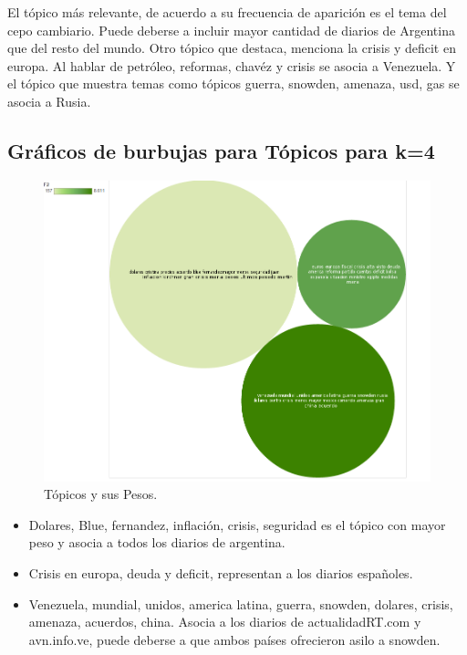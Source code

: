 \documentclass[8.5pt,twoside,twocolumn]{article}
\begin{document}
El t\'opico m\'as relevante, de acuerdo a su frecuencia de aparici\'on es el tema del cepo cambiario.  
Puede deberse a incluir mayor cantidad de diarios de Argentina que del resto del mundo.  
Otro t\'opico que destaca, menciona la crisis y deficit en europa.  
Al hablar de petr\'oleo, reformas, chav\'ez y crisis se asocia a Venezuela. 
Y el t\'opico que muestra temas como t\'opicos guerra, snowden, amenaza, usd, gas se asocia a Rusia.

\subsection{ Gr\'aficos de burbujas para T\'opicos para k=4  }
\begin{figure}[h]
  \centering
  \includegraphics[scale=0.2]{burble_k4_10_mallet_keys.png}
  \caption{T\'opicos y sus Pesos.}  
  \label{fgr:perplexity}
\end{figure}

\begin{itemize}
\item Dolares, Blue, fernandez, inflaci\'on, crisis, seguridad es el t\'opico con mayor peso y asocia a todos los diarios de argentina.
\item Crisis en europa, deuda y deficit, representan a los diarios espa\~noles. 
\item Venezuela, mundial, unidos, america latina, guerra, snowden, dolares, crisis, amenaza, acuerdos, china. Asocia a los diarios de actualidadRT.com
y avn.info.ve, puede deberse a que ambos pa\'ises ofrecieron asilo a snowden.
\end{itemize}
\end{document}
